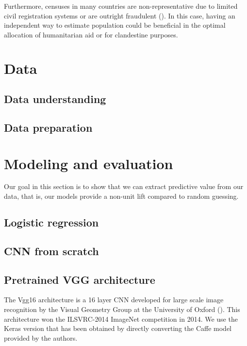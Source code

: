 \documentclass{article}
\begin{document}
Furthermore, censuses in many countries are non-representative due to limited civil registration systems or are outright fraudulent (\cite{BDYPHN06}). In this case, having an independent way to estimate population could be beneficial in the optimal allocation of humanitarian aid or for clandestine purposes.

\section{Data}
\subsection{Data understanding}

\subsection{Data preparation}
\section{Modeling and evaluation}
Our goal in this section is to show that we can extract predictive value from our data, that is, our models provide a non-unit lift compared to random guessing.
\subsection{Logistic regression}
\subsection{CNN from scratch}
\subsection{Pretrained VGG architecture}
The Vgg16 architecture is a 16 layer CNN developed for large scale image recognition by the Visual Geometry Group at the University of Oxford (\cite{SZ14}). This architecture won the ILSVRC-2014 ImageNet competition in 2014. We use the Keras version that has been obtained by directly converting the Caffe model provided by the authors.
\end{document}
